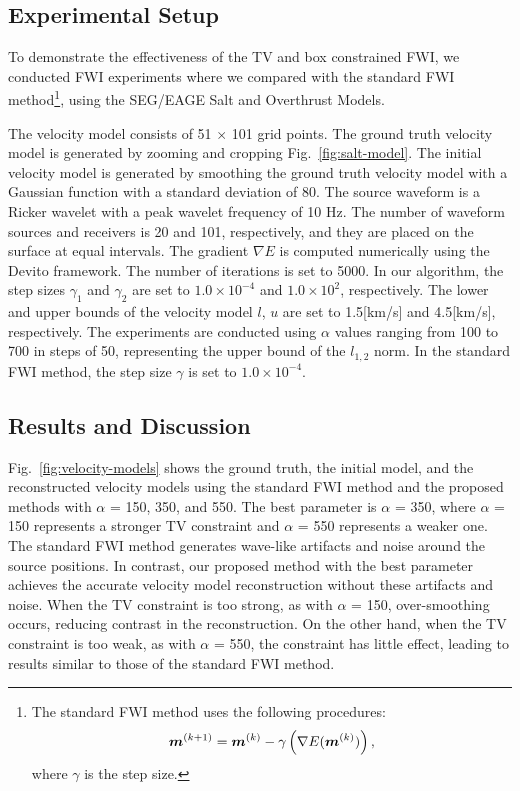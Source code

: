 

\subsection{Experimental Setup} \label{subsec:experimental-setup}

To demonstrate the effectiveness of the TV and box constrained FWI, we conducted FWI experiments where we compared with the standard FWI method\footnote{
    The standard FWI method uses the following procedures:
    \begin{equation} \label{eq:FWIWithGradient} \bm{m}^{(k+1)} = \bm{m}^{(k)} - \gamma \left( \nabla E(\bm{m}^{(k)}) \right), \end{equation} where $\gamma$ is the step size.
}\cite{FWI0}, using the SEG/EAGE Salt and Overthrust Models.

The velocity model consists of 51 $\times$ 101 grid points.
The ground truth velocity model is generated by zooming and cropping Fig.~\ref{fig:salt-model}.
The initial velocity model is generated by smoothing the ground truth velocity model with a Gaussian function with a standard deviation of 80.
The source waveform is a Ricker wavelet with a peak wavelet frequency of 10 Hz.
The number of waveform sources and receivers is 20 and 101, respectively, and they are placed on the surface at equal intervals.
The gradient $\nabla E$ is computed numerically using the Devito framework\cite{devito}.
The number of iterations is set to 5000.
In our algorithm, the step sizes $\gamma_1$ and $\gamma_2$ are set to $1.0 \times 10^{-4}$ and $1.0 \times 10^2$, respectively.
The lower and upper bounds of the velocity model $l$, $u$ are set to 1.5[km/s] and 4.5[km/s], respectively.
The experiments are conducted using $\alpha$ values ranging from 100 to 700 in steps of 50, representing the upper bound of the $l_{1,2}$ norm.
In the standard FWI method, the step size $\gamma$ is set to $1.0 \times 10^{-4}$.





\subsection{Results and Discussion} \label{subsec:results-and-discussion}

Fig.~\ref{fig:velocity-models} shows the ground truth, the initial model, and the reconstructed velocity models using the standard FWI method and the proposed methods with $\alpha$ = 150, 350, and 550.
The best parameter is $\alpha$ = 350, where $\alpha$ = 150 represents a stronger TV constraint and $\alpha$ = 550 represents a weaker one.
The standard FWI method generates wave-like artifacts and noise around the source positions.
In contrast, our proposed method with the best parameter achieves the accurate velocity model reconstruction without these artifacts and noise.
When the TV constraint is too strong, as with $\alpha$ = 150, over-smoothing occurs, reducing contrast in the reconstruction.
On the other hand, when the TV constraint is too weak, as with $\alpha$ = 550, the constraint has little effect, leading to results similar to those of the standard FWI method.

